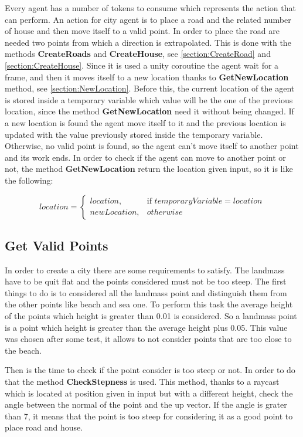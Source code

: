 \documentclass[12pt]{article}
\begin{document}
    Every agent has a number of tokens to consume which represents the action that can perform. An action for city agent is to place a road and the related number of
    house and then move itself to a valid point. In order to place the road are needed two points from which a direction is extrapolated. This is done with the methods
    \textbf{CreateRoads} and \textbf{CreateHouse}, see \ref{section:CreateRoad} and \ref{section:CreateHouse}. Since it is used a unity coroutine the agent wait for a frame, and then 
    it moves itself to a new location thanks to \textbf{GetNewLocation} method, see \ref{section:NewLocation}. Before this, the current location of the agent
    is stored inside a temporary variable which value will be the one of the previous location, since the method \textbf{GetNewLocation} need it without being changed.
    If a new location is found the agent move itself to it and the previous location is updated with the value previously stored inside the temporary variable. Otherwise,
    no valid point is found, so the agent can't move itself to another point and its work ends. In order to check if the agent can move to another point or not, the 
    method \textbf{GetNewLocation} return the location given input, so it is like the following:

    \begin{equation}
        location = \begin{cases} location, & \mbox{if } temporaryVariable { = location} \\ newLocation, & \mbox{} otherwise\  \end{cases}
    \end{equation}

    \subsection{Get Valid Points} \label{section: ValidPoints}
    In order to create a city there are some requirements to satisfy. The landmass have to be quit flat and the points considered must not be too steep.
    The first things to do is to considered all the landmass point and distinguish them from the other points like beach and sea one. To perform this task the
    average height of the points which height is greater than 0.01 is considered. So a landmass point is a point which height is greater than the average height plus
    0.05. This value was chosen after some test, it allows to not consider points that are too close to the beach. 

    Then is the time to check if the point consider is too steep or not. In order to do that the method \textbf{CheckStepness} is used. This method, thanks to a
    raycast which is located at position given in input but with a different height, check the angle between the normal of the point and the up vector. If the 
    angle is grater than 7, it means that the point is too steep for considering it as a good point to place road and house.
    
\end{document}
